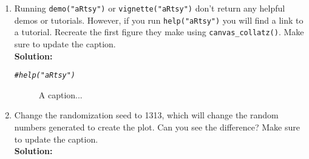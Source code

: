 \documentclass{article}\usepackage[]{graphicx}\usepackage[]{xcolor}
\makeatletter
\newcommand{\hlcom}[1]{\textcolor[rgb]{0.678,0.584,0.686}{\textit{#1}}}%
\newenvironment{kframe}{%
 \def\at@end@of@kframe{}%
 \ifinner\ifhmode%
  \def\at@end@of@kframe{\end{minipage}}%
  \begin{minipage}{\columnwidth}%
 \fi\fi%
 \def\FrameCommand##1{\hskip\@totalleftmargin \hskip-\fboxsep
 \colorbox{shadecolor}{##1}\hskip-\fboxsep
     \hskip-\linewidth \hskip-\@totalleftmargin \hskip\columnwidth}%
 \MakeFramed {\advance\hsize-\width
   \@totalleftmargin\z@ \linewidth\hsize
   \@setminipage}}%
 {\par\unskip\endMakeFramed%
 \at@end@of@kframe}
\newenvironment{knitrout}{}{} %
\makeatother
\begin{document}
\begin{enumerate}
\begin{enumerate}
 \item Running \texttt{demo("aRtsy")} or \texttt{vignette("aRtsy")} don't return 
any helpful demos or tutorials. However, if you run \texttt{help("aRtsy")} you 
will find a link to a tutorial. Recreate the first figure they make using 
\texttt{canvas\_collatz()}. Make sure to update the caption.\\
\textbf{Solution:}
\begin{knitrout}\scriptsize
{}\color{fgcolor}\begin{kframe}
\begin{alltt}
\hlcom{# help("aRtsy")}
\end{alltt}
\end{kframe}
\end{knitrout}
\begin{figure}[H]
\begin{center}
  \caption{A caption...}
\label{CollatzPlot1}
\end{center}
\end{figure}
  \item Change the randomization seed to 1313, which will change the random
numbers generated to create the plot. Can you see the difference? Make sure to 
update the caption.\\
\textbf{Solution:}


\end{enumerate}
\end{enumerate}
\end{document}
